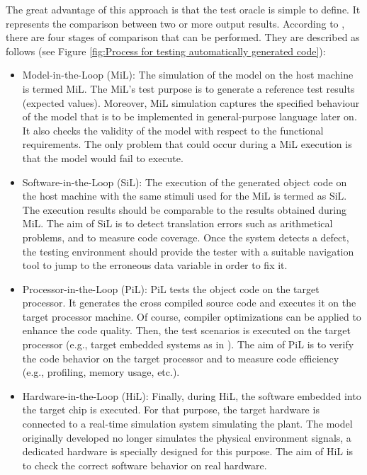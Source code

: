 The great advantage of this approach is that the test oracle is simple to define. It represents the comparison between two or more output results. According to \cite{shokry2009model,stuermer2007systematic}, there are four stages of comparison that can be performed. They are described as follows (see Figure \ref{fig:Process for testing automatically generated code}):
 
\begin{itemize}
	\item Model-in-the-Loop (MiL): 
	The simulation of the model on the host machine is termed MiL. 
    The MiL's test purpose is to generate a reference test results (expected values). Moreover, MiL simulation captures the specified behaviour of the model that is to be implemented in general-purpose language later on. It also checks the validity of the model with respect to the functional requirements. The only problem that could occur during a MiL execution is that the model would fail to execute.

	\item Software-in-the-Loop (SiL): 
	The execution of the generated object code on the host machine with the same stimuli used for the MiL is termed as SiL. The execution results should be comparable to the results obtained during MiL. 
	The aim of SiL is to detect translation errors such as arithmetical problems, and to measure code coverage.
	Once the system detects a defect, the testing environment should provide the tester with a suitable navigation tool to jump to the erroneous data variable in order to fix it.
	
	\item Processor-in-the-Loop (PiL): 
	PiL tests the object code on the target processor. It generates the cross compiled source code and executes it on the target processor machine. Of course, compiler optimizations can be applied to enhance the code quality. Then, the test scenarios is executed on the target processor (e.g., target embedded systems as in \cite{shokry2009model}). The aim of PiL is to verify the code behavior on the target processor and to measure code efficiency (e.g., profiling, memory usage, etc.).
	
	\item Hardware-in-the-Loop (HiL): 
	Finally, during HiL, the software embedded into the target chip is executed. For that purpose, the target hardware is connected to a real-time simulation system simulating the plant. The model originally developed no longer simulates the physical environment signals, a dedicated hardware is specially designed for this purpose. The aim of HiL is to check the correct software behavior on real hardware.
\end{itemize}

